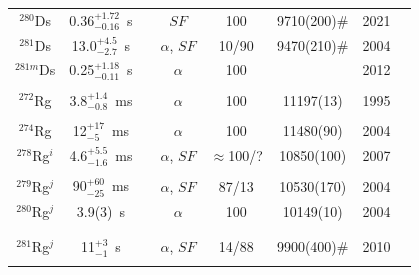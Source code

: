 \begin{center}
\begin{longtable}{c|ccccccl}
$^{280}$Ds	& 0.36$^{+1.72}_{-0.16}$~s& &$SF$				&100		&9710(200)$\#$	    &2021	&{\tiny\cite{Samark-Roth2021}}\\
$^{281}$Ds	& 13.0$^{+4.5}_{-2.7}$~s& 	&$\alpha$, $SF$		&10/90   	&9470(210)$\#$	    &2004	&{\tiny\cite{Oganessian2004,Oganessian2004a,Hofmann2012,Kaji2017}}\\
$^{281m}$Ds	& 0.25$^{+1.18}_{-0.11}$~s& &$\alpha$		    &100   	    &            	    &2012	&{\tiny\cite{Hofmann2012,Kaji2017}}\\
\hline\\
$^{272}$Rg	& 3.8$^{+1.4}_{-0.8}$~ms& 	&$\alpha$			&100		&11197(13)		    &1995	&{\tiny\cite{Hofmann1995,Hofmann1997,Hofmann1997a,Hofmann1998,Hessberger1999,Hofmann2000}}\\
			&				&			&					&			& 				    &		&{\tiny\cite{Folden2004,Morita2004a,Morita2004c}}\\
$^{274}$Rg	& 12$^{+17}_{-5}$~ms& 		&$\alpha$			&100		&11480(90)		    &2004	&{\tiny\cite{Morita2004b,Morita2007a,Morita2008,Morita2009a,Morita2012,Morita2015}}\\
$^{278}$Rg$^i$& 4.6$^{+5.5}_{-1.6}$~ms& &$\alpha$, $SF$		&$\approx$100/?&10850(100)		&2007	&{\tiny\cite{Oganessian2007b,Oganessian2007,Oganessian2007a,Oganessian2011a,Oganessian2012,Oganessian2013}}\\
			&				&			&					&			& 				    &		&{\tiny\cite{Oganessian2015,Oganessian2017,Oganessian2022d}}\\
$^{279}$Rg$^j$& 90$^{+60}_{-25}$~ms&	&$\alpha$, $SF$		&87/13		&10530(170)		    &2004	&{\tiny\cite{Oganessian2003,Oganessian2004,Rudolph2013,Forsberg2016,Oganessian2022c,Oganessian2022d}}\\
$^{280}$Rg$^j$& 3.9(3)~s& 			    &$\alpha$			&100	    &10149(10)		    &2004	&{\tiny\cite{Oganessian2004,Dmitriev2005,Oganessian2005,Oganessian2011,Oganessian2012,Oganessian2013}}\\
			&				&			&					&			& 				    &		&{\tiny\cite{Rudolph2013,Dmitriev2014,Gates2015,Oganessian2015,Rudolph2015,Forsberg2016}}\\
			&				&			&					&			& 				    &		&{\tiny\cite{Aksenov2017,Oganessian2017,Gates2018,Oganessian2022d}}\\
$^{281}$Rg$^j$& 11$^{+3}_{-1}$~s& 		&$\alpha$, $SF$		&14/88  &9900(400)$\#$	        &2010	&{\tiny\cite{Oganessian2010,Oganessian2011,Oganessian2011a,Oganessian2012a,Oganessian2015,Oganessian2017}}\\
			&				&			&					&			& 				    &		&{\tiny\cite{Khuyagbaatar2019,Oganessian2022d}}\\

\end{longtable}
\end{center}
